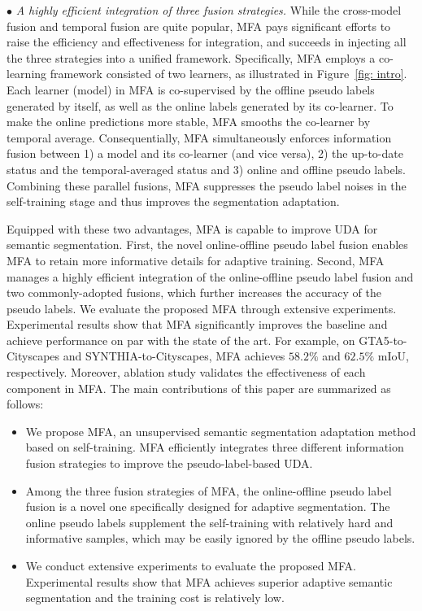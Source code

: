 \documentclass{bmvc2k}
\begin{document}
$\bullet$ \emph{A highly efficient integration of three fusion strategies.} While the cross-model fusion and temporal fusion are quite popular, MFA pays significant efforts to raise the efficiency and effectiveness for integration, and succeeds in injecting all the three strategies into a unified framework. Specifically, MFA employs a co-learning framework consisted of two learners, as illustrated in Figure~\ref{fig: intro}. Each learner (model) in MFA is co-supervised by the offline pseudo labels generated by itself, as well as the online labels generated by its co-learner. To make the online predictions more stable, MFA smooths the co-learner by temporal average. Consequentially, MFA simultaneously enforces information fusion between 1) a model and its co-learner (and vice versa), 2) the up-to-date status and the temporal-averaged status and 3) online and offline pseudo labels. Combining these parallel fusions, MFA suppresses the pseudo label noises in the self-training stage and thus improves the segmentation adaptation.

Equipped with these two advantages, MFA is capable to improve UDA for semantic segmentation. First, the novel online-offline pseudo label fusion enables MFA to retain more informative details for adaptive training. Second, MFA manages a highly efficient integration of the online-offline pseudo label fusion and two commonly-adopted fusions, which further increases the accuracy of the pseudo labels. We evaluate the proposed MFA through extensive experiments. Experimental results show that MFA significantly improves the baseline and achieve performance on par with the state of the art. For example, on GTA5-to-Cityscapes and SYNTHIA-to-Cityscapes, MFA achieves $58.2\%$ and $62.5\%$ mIoU, respectively. Moreover, ablation study validates the effectiveness of each component in MFA. The main contributions of this paper are summarized as follows:
 
\begin{itemize}
\vspace{-2pt}
\setlength{\itemsep}{0pt}
\setlength{\parsep}{0pt}
\setlength{\parskip}{0pt}
    \item We propose MFA, an unsupervised semantic segmentation adaptation method based on self-training. MFA efficiently integrates three different information fusion strategies to improve the pseudo-label-based UDA. 
    \item Among the three fusion strategies of MFA, the online-offline pseudo label fusion is a novel one specifically designed for adaptive segmentation. The online pseudo labels supplement the self-training with relatively hard and informative samples, which may be easily ignored by the offline pseudo labels. 
\item We conduct extensive experiments to evaluate the proposed MFA. Experimental results show that MFA achieves superior adaptive semantic segmentation and the training cost is relatively low. 


\end{itemize}
\end{document}
